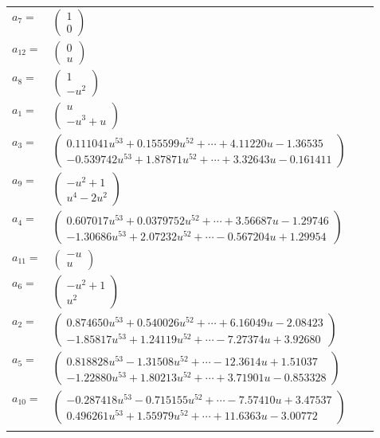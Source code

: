 \documentclass[1p]{elsarticle_modified}
\theoremstyle{definition}
\begin{document}
\begin{tabular}{m{7pt} m{180pt} m{7pt} m{180pt} }
\flushright $a_{7}=$&$\begin{pmatrix}1\\0\end{pmatrix}$ \\
\flushright $a_{12}=$&$\begin{pmatrix}0\\u\end{pmatrix}$ \\
\flushright $a_{8}=$&$\begin{pmatrix}1\\- u^2\end{pmatrix}$ \\
\flushright $a_{1}=$&$\begin{pmatrix}u\\- u^3+u\end{pmatrix}$ \\
\flushright $a_{3}=$&$\begin{pmatrix}0.111041 u^{53}+0.155599 u^{52}+\cdots+4.11220 u-1.36535\\-0.539742 u^{53}+1.87871 u^{52}+\cdots+3.32643 u-0.161411\end{pmatrix}$ \\
\flushright $a_{9}=$&$\begin{pmatrix}- u^2+1\\u^4-2 u^2\end{pmatrix}$ \\
\flushright $a_{4}=$&$\begin{pmatrix}0.607017 u^{53}+0.0379752 u^{52}+\cdots+3.56687 u-1.29746\\-1.30686 u^{53}+2.07232 u^{52}+\cdots-0.567204 u+1.29954\end{pmatrix}$ \\
\flushright $a_{11}=$&$\begin{pmatrix}- u\\u\end{pmatrix}$ \\
\flushright $a_{6}=$&$\begin{pmatrix}- u^2+1\\u^2\end{pmatrix}$ \\
\flushright $a_{2}=$&$\begin{pmatrix}0.874650 u^{53}+0.540026 u^{52}+\cdots+6.16049 u-2.08423\\-1.85817 u^{53}+1.24119 u^{52}+\cdots-7.27374 u+3.92680\end{pmatrix}$ \\
\flushright $a_{5}=$&$\begin{pmatrix}0.818828 u^{53}-1.31508 u^{52}+\cdots-12.3614 u+1.51037\\-1.22880 u^{53}+1.80213 u^{52}+\cdots+3.71901 u-0.853328\end{pmatrix}$ \\
\flushright $a_{10}=$&$\begin{pmatrix}-0.287418 u^{53}-0.715155 u^{52}+\cdots-7.57410 u+3.47537\\0.496261 u^{53}+1.55979 u^{52}+\cdots+11.6363 u-3.00772\end{pmatrix}$\\&\end{tabular}
\end{document}
